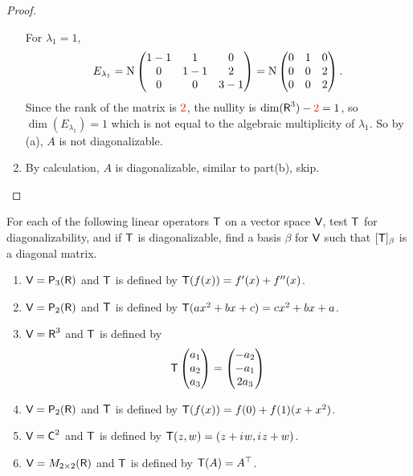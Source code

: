 \begin{proof}
\begin{enumerate}
For \(\lambda_1 = 1\),
\[
    E_{\lambda_1} = \mathrm{N} \begin{pmatrix} 1-1 & 1 & 0 \\ 0 & 1-1 & 2 \\ 0 & 0 & 3-1 \end{pmatrix} = \mathrm{N} \begin{pmatrix} 0 & 1 & 0 \\ 0 & 0 & 2 \\ 0 & 0 & 2 \end{pmatrix}.
\]
Since the rank of the matrix is \(\RED{2}\), the nullity is \(\dim(\SET{R}^3) - \RED{2} = 1\), so \(\dim(E_{\lambda_1}) = 1\) which is not equal to the algebraic multiplicity of \(\lambda_1\).
So by (a), \(A\) is not diagonalizable.

\item By calculation, \(A\) is diagonalizable, similar to part(b), skip.
\end{enumerate}
\end{proof}

\begin{exercise} \label{exercise 5.2.3}
For each of the following linear operators \(\textsf{T}\) on a vector space \(\textsf{V}\), test \(\textsf{T}\) for diagonalizability, and if \(\textsf{T}\) is diagonalizable, find a basis \(\beta\) for \(\textsf{V}\) such that \([\textsf{T}]_{\beta}\) is a diagonal matrix.

\begin{enumerate}
\item \(\textsf{V} = \textsf{P}_3(\textsf{R})\) and \(\textsf{T}\) is defined by \(\textsf{T}(f(x)) = f'(x) + f''(x)\).
\item \(\textsf{V} = \textsf{P}_2(\textsf{R})\) and \(\textsf{T}\) is defined by \(\textsf{T}(ax^2 + bx + c) = cx^2 + bx + a\).
\item \(\textsf{V} = \textsf{R}^3\) and \(\textsf{T}\) is defined by
\[
    \textsf{T} \begin{pmatrix} a_1 \\ a_2 \\ a_3 \end{pmatrix}
    = \begin{pmatrix} -a_2 \\ -a_1 \\ 2a_3 \end{pmatrix}
\]
\item \(\textsf{V} = \textsf{P}_2(\textsf{R})\) and \(\textsf{T}\) is defined by \(\textsf{T}(f(x)) = f(0) + f(1)(x + x^2)\).
\item \(\textsf{V} = \textsf{C}^2\) and \(\textsf{T}\) is defined by \(\textsf{T}(z, w) = (z + {i\mkern1mu} w, {i\mkern1mu} z + w)\).
\item \(\textsf{V} = M_{2 \times 2}(\textsf{R})\) and \(\textsf{T}\) is defined by \(\textsf{T}(A) = A^\top\).
\end{enumerate}
\end{exercise}

